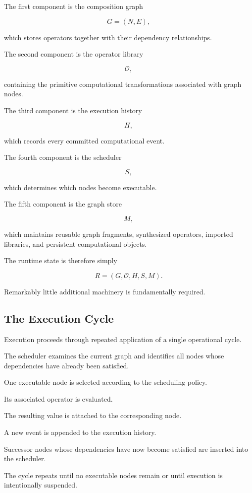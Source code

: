 \documentclass[12pt,oneside]{article}
\begin{document}
The first component is the composition graph

\[
G=(N,E),
\]

which stores operators together with their dependency relationships.

The second component is the operator library

\[
\mathcal O,
\]

containing the primitive computational transformations associated with graph nodes.

The third component is the execution history

\[
H,
\]

which records every committed computational event.

The fourth component is the scheduler

\[
S,
\]

which determines which nodes become executable.

The fifth component is the graph store

\[
M,
\]

which maintains reusable graph fragments, synthesized operators, imported libraries, and persistent computational objects.

The runtime state is therefore simply

\[
R=(G,\mathcal O,H,S,M).
\]

Remarkably little additional machinery is fundamentally required.

\subsection{The Execution Cycle}

Execution proceeds through repeated application of a single operational cycle.

The scheduler examines the current graph and identifies all nodes whose dependencies have already been satisfied.

One executable node is selected according to the scheduling policy.

Its associated operator is evaluated.

The resulting value is attached to the corresponding node.

A new event is appended to the execution history.

Successor nodes whose dependencies have now become satisfied are inserted into the scheduler.

The cycle repeats until no executable nodes remain or until execution is intentionally suspended.
\end{document}
